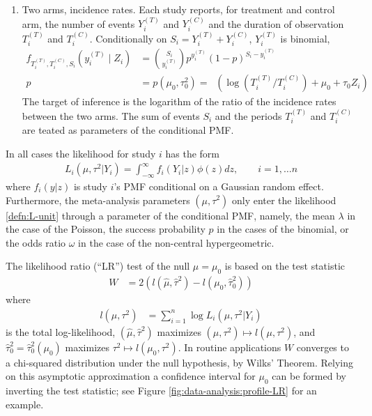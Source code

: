 \documentclass[12pt]{article}
\DeclareMathOperator{\expit}{logit^{-1}}
\newcommand{\Z}{Z}
\newcommand{\z}{z}
\newcommand{\Y}{Y}
\newcommand{\y}{y}
\newcommand{\T}[1]{{#1}^{(T)}}
\newcommand{\C}[1]{{#1}^{(C)}}
\newcommand{\W}{W}
\newcommand{\effect}{\mu}
\newcommand{\munull}{\mu_0}
\newcommand{\tausqnull}{\tau^2_{0}}
\newcommand{\taunull}{\tau_0}
\begin{document}
\begin{enumerate}
\item Two arms, incidence rates. Each study reports, for treatment and control arm, the number of events $\T{\Y}_i$ and $\C{\Y}_i$ and the duration of observation $\T{T}_i$ and $\C{T}_i$. Conditionally on $S_i=\T{\Y}_i+\C{\Y}_i$, $\T{\Y}_i$ is binomial,
  \begin{equation}
    \begin{split}
  f_{\T{T}_i,\C{T}_i,S_i   }(\T{\y}_i \mid \Z_i) &= {S_i \choose \T{\y}_i}p^{\T{\y}_i}(1-p)^{S_i - \T{\y}_i}\\
  p &= p(\munull,\tausqnull) = \expit(\log(\T{T}_i/\C{T}_i)+\munull + \taunull\Z_i)
\end{split}
\label{mod:bn-irr}
\end{equation}
The target of inference is the logarithm of the ratio of the incidence
rates between the two arms. The sum of events $S_i$ and the
periods $\T{T}_i$ and $\C{T}_i$ are teated as parameters of the
conditional PMF.
\end{enumerate}
In all cases the likelihood for  study $i$ has the form
\begin{align}
  L_i(\effect,\tau^2 | \Y_i) = \int_{-\infty}^\infty f_i(\Y_i|\z)\phi(\z)d\z, \qquad i=1,\ldots n
  \label{defn:L-unit}
\end{align}
where $f_i(y|\z)$ is study $i$'s  PMF conditional on a Gaussian random effect. Furthermore, the meta-analysis  parameters $(\effect,\tau^2)$ only enter the likelihood \eqref{defn:L-unit} through a parameter of the conditional PMF, namely, the mean $\lambda$ in the case of the Poisson, the success probability $p$ in the cases of the binomial, or the odds ratio $\omega$ in the case of the non-central hypergeometric.

The likelihood ratio (``LR'') test of the null $\effect=\munull$ is based on the test statistic
\begin{align}
  \W &= 2( l(\hat\effect,\hat\tau^2) - l(\munull,\hat{\tau}^2_0) )
    \label{defn:W}
\end{align}
where
\begin{align}
  l(\effect,\tau^2) &= \sum_{i=1}^n\log L_i(\effect,\tau^2 | \Y_i)
    \label{defn:l}
\end{align}
is the total log-likelihood, $(\hat\effect,\hat\tau^2)$ maximizes
$(\effect,\tau^2)\mapsto l(\effect,\tau^2)$,
and $\hat{\tau}^2_0=\hat{\tau}^2_0(\munull)$ maximizes
$\tau^2 \mapsto l(\munull,\tau^2)$.  In routine applications  $\W$ converges to a chi-squared
distribution  under the null hypothesis, by Wilks' Theorem. Relying on this asymptotic approximation a confidence interval
for $\munull$ can be formed by inverting the test statistic; see Figure \ref{fig:data-analysis:profile-LR} for an example.
\end{document}
